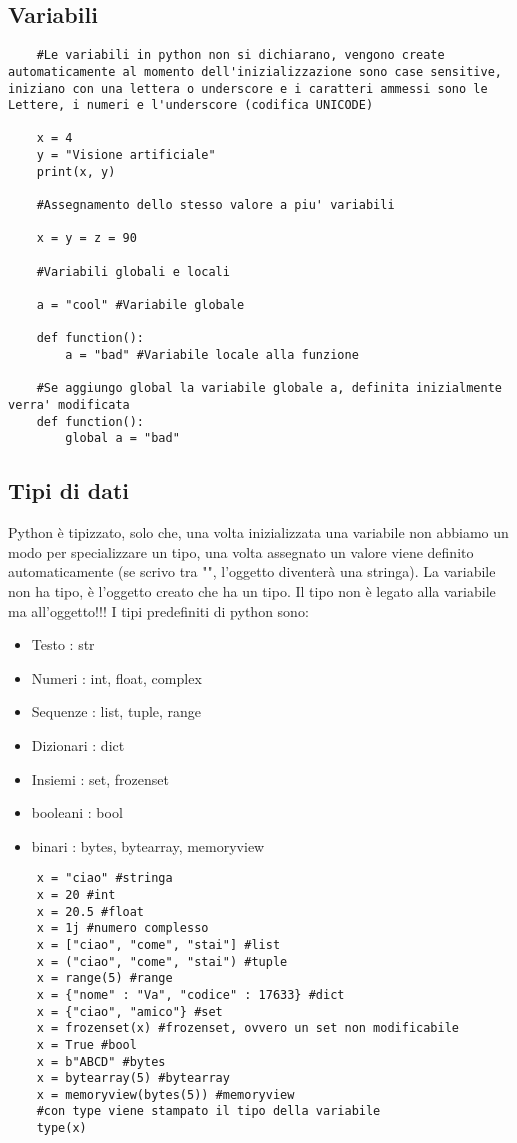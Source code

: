 \subsection{Variabili}

\begin{lstlisting}
	#Le variabili in python non si dichiarano, vengono create automaticamente al momento dell'inizializzazione sono case sensitive, iniziano con una lettera o underscore e i caratteri ammessi sono le Lettere, i numeri e l'underscore (codifica UNICODE)
	
	x = 4
	y = "Visione artificiale"
	print(x, y)
	
	#Assegnamento dello stesso valore a piu' variabili
	
	x = y = z = 90
	
	#Variabili globali e locali
	
	a = "cool" #Variabile globale
	
	def function():
		a = "bad" #Variabile locale alla funzione 
		
	#Se aggiungo global la variabile globale a, definita inizialmente verra' modificata
	def function():
		global a = "bad"
\end{lstlisting}

\subsection{Tipi di dati}

Python è tipizzato, solo che, una volta inizializzata una variabile non abbiamo un modo per specializzare un tipo, una volta assegnato un valore viene definito automaticamente (se scrivo tra "", l'oggetto diventerà una stringa). La variabile non ha tipo, è l'oggetto creato che ha un tipo. Il tipo non è legato alla variabile ma all'oggetto!!! I tipi predefiniti di python sono:
\begin{itemize}
	\item Testo : str
	\item Numeri : int, float, complex
	\item Sequenze : list, tuple, range
	\item Dizionari : dict
	\item Insiemi : set, frozenset
	\item booleani : bool
	\item binari : bytes, bytearray, memoryview
\end{itemize}

\newpage

\begin{lstlisting}
	x = "ciao" #stringa
	x = 20 #int
	x = 20.5 #float
	x = 1j #numero complesso
	x = ["ciao", "come", "stai"] #list
	x = ("ciao", "come", "stai") #tuple
	x = range(5) #range
	x = {"nome" : "Va", "codice" : 17633} #dict
	x = {"ciao", "amico"} #set
	x = frozenset(x) #frozenset, ovvero un set non modificabile
	x = True #bool
	x = b"ABCD" #bytes
	x = bytearray(5) #bytearray
	x = memoryview(bytes(5)) #memoryview
	#con type viene stampato il tipo della variabile
	type(x)
\end{lstlisting}

